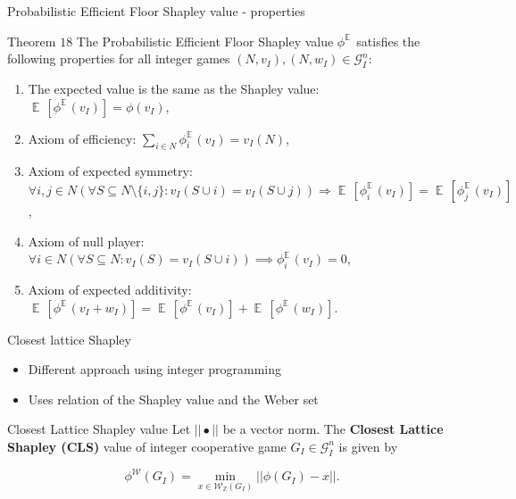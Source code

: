 \documentclass{beamer}
\newcommand{\Z}{\mathbb{Z}}
\DeclareMathOperator{\E}{\mathbb{E}\,}
\begin{document}
\begin{frame}{Probabilistic Efficient Floor Shapley value - properties}

    \begin{block}{Theorem $18$}
        The Probabilistic Efficient Floor Shapley value $\phi^{\E}$  satisfies the following properties for all integer games $(N,v_I),(N,w_I) \in \mathcal{G}_I^n$:
        \begin{enumerate}
            \item The expected value is the same as the Shapley value: $\E[\phi^{\E}(v_I)] = \phi(v_I)$,
            \item Axiom of efficiency: $\sum_{i \in N}\phi_{i}^{\E}(v_I) = v_I(N)$,
            \item Axiom of expected symmetry: $\forall i,j \in N (\forall S \subseteq N \setminus \{i,j\}: v_I(S \cup i) = v_I(S \cup j)) \Rightarrow \E[\phi_{i}^{\E}(v_I)] = \E[\phi_{j}^{\E}(v_I)]$,
            \item Axiom of null player: $\forall i \in N(\forall S \subseteq N: v_I(S)=v_I(S \cup i)) \implies \phi_{i}^{\E}(v_I) = 0$,
            \item Axiom of expected additivity: $\E[\phi^{\E}(v_I+w_I)] = \E[\phi^{\E}(v_I)] + \E[\phi^{\E}(w_I)]$.
        \end{enumerate}
    \end{block}

\end{frame}



\begin{frame}{Closest lattice Shapley}
    \begin{itemize}
        \item Different approach using integer programming
        \item Uses relation of the Shapley value and the Weber set
    \end{itemize}

    \begin{block}{Closest Lattice Shapley value}
        Let $||\bullet||$ be a vector norm. The \textbf{Closest Lattice Shapley (CLS)} value of integer cooperative game $G_I \in \mathcal{G}_I^n$ is given by

        \begin{displaymath}
            \phi^\mathcal{W}(G_I)  = \min_{x \in \mathcal{W}_\Z(G_I)} ||\phi(G_I) - x||.
        \end{displaymath}
    \end{block}
\end{frame}
\end{document}
